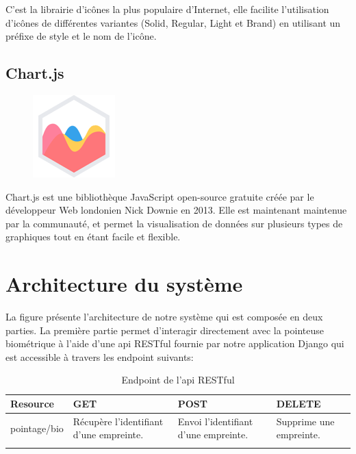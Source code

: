 C’est la librairie d'icônes la plus populaire d'Internet, elle facilite
l’utilisation  d’icônes de différentes variantes (Solid, Regular, Light et
Brand) en utilisant un préfixe de style et le nom de l'icône\cite{28}.

\subsection{Chart.js}
\begin{figure}
    \vspace{-22pt}
    \begin{center}
        \includegraphics[scale=0.36]{images/logo/chartjs.png}
        \label{fig83}
    \end{center}
    \vspace{-20pt}
    \vspace{-10pt}
\end{figure}

Chart.js est une bibliothèque JavaScript open-source gratuite créée par le 
développeur Web londonien Nick Downie en 2013. Elle est maintenant maintenue par 
la communauté, et permet la visualisation de données sur plusieurs types de 
graphiques tout en étant facile et flexible\cite{29}.

\section{Architecture du système} 
La figure présente l’architecture de notre système qui est composée en deux
parties. La première partie permet d’interagir directement avec la pointeuse
biométrique à l'aide d'une api RESTful fournie par notre application Django
qui est accessible à travers les endpoint suivants:

\begin{longtable}{|p{2.5cm}|p{4.5cm}|p{4.5cm}|p{4.5cm}|}
    \endhead
    \endfoot
    \hline
    Resource & GET & POST & DELETE \\
    \hline
    pointage/bio & Récupère l'identifiant d'une empreinte. & Envoi l'identifiant
    d'une empreinte. & Supprime une empreinte.
    \\
    \hline
    \caption{Endpoint de l'api RESTful}\\
\end{longtable}

